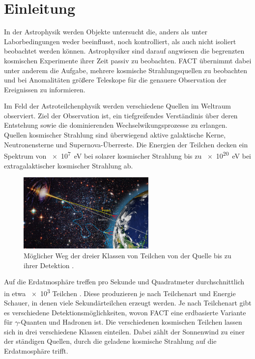 \chapter{Einleitung}
In der Astrophysik werden Objekte untersucht die, anders als unter Laborbedingungen weder beeinflusst, noch kontrolliert, als auch nicht isoliert beobachtet werden können.
Astrophysiker sind darauf angwiesen die begrenzten kosmischen Experimente ihrer Zeit passiv zu beobachten. 
FACT übernimmt dabei unter anderem die Aufgabe, mehrere kosmische Strahlungsquellen zu beobachten und bei Anomalitäten größere Teleskope für die genauere Observation der Ereignissen zu informieren. 

Im Feld der Astroteilchenphysik werden verschiedene Quellen im Weltraum observiert.
Ziel der Observation ist, ein tiefgreifendes Verständinis über deren Entstehung sowie die dominierenden Wechselwikungsprozesse zu erlangen. 
Quellen kosmischer Strahlung sind überwiegend aktive galaktische Kerne, Neutronensterne und Supernova-Überreste. 
Die Energien der Teilchen decken ein Spektrum von \SI{e7}{\electronvolt} bei solarer kosmischer Strahlung bis zu \SI{e20}{\electronvolt} bei extragalaktischer kosmischer Strahlung ab. 

\begin{figure}
  \centering
  \includegraphics[width=0.6\textwidth]{./images/sources-detection.jpg}
  \caption{Möglicher Weg der dreier Klassen von Teilchen von der Quelle bis zu ihrer Detektion \cite{overview-detec}.}
\end{figure}

Auf die Erdatmosphäre treffen pro Sekunde und Quadratmeter durchschnittlich in etwa \num{e3} Teilchen \cite{AlewWolf}.
Diese produzieren je nach Teilchenart und Energie Schauer, in denen viele Sekundärteilchen erzeugt werden. 
Je nach Teilchenart gibt es verschiedene Detektionsmöglichkeiten, wovon FACT eine erdbasierte Variante für $\gamma$-Quanten und Hadronen ist. 
Die verschiedenen kosmischen Teilchen lassen sich in drei verschiedene Klassen einteilen. 
Dabei zählt der Sonnenwind zu einer der ständigen Quellen, durch die geladene kosmische Strahlung auf die Erdatmosphäre trifft.


